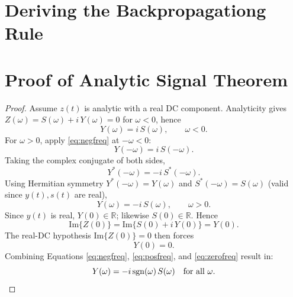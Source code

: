 \chapter{Deriving the Backpropagationg Rule} \label{appendix-a}


\chapter{Proof of Analytic Signal Theorem} \label{appendix-b}

\begin{proof}
Assume $z(t)$ is analytic with a real DC component. Analyticity gives $Z(\omega) = S(\omega) + i\,Y(\omega) = 0$ for $\omega<0$, hence
\begin{equation}
Y(\omega) = i\,S(\omega), \qquad \omega<0. \label{eq:negfreq}
\end{equation}
For $\omega>0$, apply \eqref{eq:negfreq} at $-\omega<0$:
\begin{equation}
Y(-\omega) = i\,S(-\omega). \label{eq:negfreq-applied}
\end{equation}
Taking the complex conjugate of both sides,
\begin{equation}
Y^*(-\omega) = -i\,S^*(-\omega). \label{eq:conjugate}
\end{equation}
Using Hermitian symmetry $Y^*(-\omega) = Y(\omega)$ and $S^*(-\omega) = S(\omega)$ (valid since $y(t), s(t)$ are real),
\begin{equation}
Y(\omega) = -i\,S(\omega), \qquad \omega>0. \label{eq:posfreq}
\end{equation}
Since $y(t)$ is real, $Y(0) \in \mathbb{R}$; likewise $S(0)\in\mathbb{R}$. Hence
\begin{equation}
\mathrm{Im}\{Z(0)\} = \mathrm{Im}\{S(0) + i\,Y(0)\} = Y(0). \label{eq:imz0}
\end{equation}
The real-DC hypothesis $\mathrm{Im}\{Z(0)\}=0$ then forces
\begin{equation}
Y(0) = 0. \label{eq:zerofreq}
\end{equation}
Combining Equations \eqref{eq:negfreq}, \eqref{eq:posfreq}, and \eqref{eq:zerofreq} result in:
\begin{equation}
Y(\omega) = -i\,\mathrm{sgn}(\omega)\,S(\omega) \quad \text{for all } \omega. \qedhere
\label{eq:final}
\end{equation}
\end{proof}


